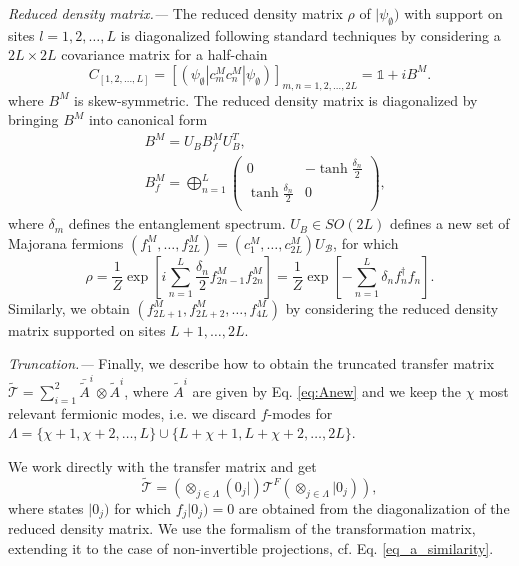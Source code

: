 \documentclass[prl,twocolumn,showpacs,floatfix,superscriptaddress,nofootinbib]{revtex4-1}
\newcommand{\Br}[1]{\left[#1\right]}
\begin{document}
{\it Reduced density matrix.--- } The reduced density matrix $\rho$ of $|\psi_\emptyset )$ with support on sites $l=1,2,\dotsc,L$ is diagonalized following standard techniques \cite{a:Peschel2009} by considering a $2L\times 2L$ covariance matrix for a half-chain 
\begin{equation*}
C_{[1,2,\dotsc,L]} = \Br{(\psi_\emptyset| c^M_m c^M_n  | \psi_\emptyset)}_{m,n = 1,2, \dotsc,2L} = \mathbb{1} + i B^{M}.
\end{equation*}
where $B^{M}$ is skew-symmetric. The reduced density matrix is diagonalized by bringing $B^M$ into canonical form
\begin{eqnarray*}
& B^M = U_B B_f^M U_B^T, \\
& B^M_f = \bigoplus_{n=1}^L \begin{pmatrix}
0 &  - \tanh \frac{\delta_n}{2} \\
 \tanh \frac{\delta_n}{2}  & 0 \\
\end{pmatrix},
\end{eqnarray*}
where $\delta_m$ defines the entanglement spectrum. $U_B \in SO(2L)$ defines a new set of Majorana fermions $(f_1^M,\dotsc,f_{2L}^M) =  (c_1^M,\dotsc,c_{2L}^M) U_\mathcal{B}$, for which 
\begin{equation*}
 \rho = \frac{1}{Z} \exp \Br{i \sum_{n=1}^{L} \frac{\delta_n}{2} f^M_{2n-1} f^M_{2n}} =\frac{1}{Z} \exp \Br{-\sum_{n=1}^{L} \delta_n f^\dagger_n f_n} . 
\end{equation*}
Similarly, we obtain $(f^M_{2L+1},f^M_{2L+2},\dotsc,f^M_{4L})$ by considering the reduced density matrix supported on sites $L+1,\dotsc,2L$. 


{\it Truncation.---}  Finally, we describe how to obtain the truncated transfer matrix $\tilde {\mathcal{T}}=\sum_{i=1}^2  \bar{\tilde A}^{i}  \otimes \tilde A^i$, where 
$\tilde A^i$ are given by Eq. \eqref{eq:Anew} and we keep the $\chi$ most relevant fermionic modes, i.e. we discard $f$-modes for  $\Lambda = \{\chi+1,\chi+2,\dotsc,L\} \cup \{ L+\chi+1,L+\chi+2,\dotsc ,2 L\}$. 

We work directly with the transfer matrix and get 
$$
\tilde{\mathcal{T}} = (\otimes _{j \in \Lambda } (0_j|)  \mathcal{T}^F  (\otimes_{j \in \Lambda }| 0_j)),$$ 
where states $|0_j)$ for which $f_j|0_j) =0$ are obtained from the diagonalization of the reduced density matrix. We use the formalism of the transformation matrix, extending it to the case of non-invertible projections, cf. Eq. \eqref{eq_a_similarity}.
\end{document}
